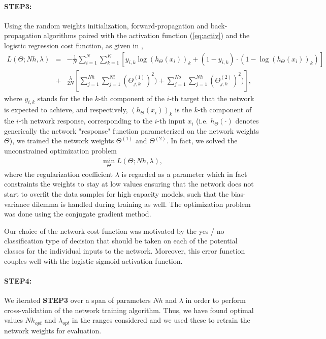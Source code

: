 \documentclass[a4paper,10pt]{article}
\begin{document}
\paragraph{STEP3:}Using the random weights initialization, forward-propagation and back-propagation algorithms paired with the activation function (\ref{eq:activ}) and the logistic regression cost function, as given in \cite{an},
\begin{eqnarray}\label{eq:cost}
L(\Theta;Nh,\lambda) &=& -\frac{1}{N}\sum_{i=1}^{N}\sum_{k=1}^{K}\left[y_{i,k}\log(h_{\Theta}(x_i))_k + (1-y_{i,k})\cdot(1-\log(h_{\Theta}(x_i))_k)\right] \\\nonumber &+& \frac{\lambda}{2N}\left[\sum_{j=1}^{Nh}\sum_{j=1}^{Ni}(\Theta^{(1)}_{j,k})^2) + \sum_{j=1}^{No}\sum_{j=1}^{Nh}(\Theta^{(2)}_{j,k})^2)\right],
\end{eqnarray}
where $y_{i,k}$ stands for the the $k$-th component of the $i$-th target that the network is expected to achieve, and respectively, $(h_{\Theta}(x_i))_k$ is the $k$-th component of the $i$-th network response, corresponding to the $i$-th input $x_i$ (i.e. $h_{\Theta}(\cdot)$ denotes generically the network "response" function parameterized on the network weights $\Theta$), we trained the network weights $\Theta^{(1)}$ and $\Theta^{(2)}$. In fact, we solved the unconstrained optimization problem 
\begin{eqnarray}\label{eq:opt_pb}
\min_{\Theta} L(\Theta;Nh,\lambda),
\end{eqnarray}
where the regularization coefficient $\lambda$ is regarded as a parameter which in fact constraints the weights to stay at low values ensuring that the network does not start to overfit the data samples for high capacity models, such that the bias-variance dilemma is handled during training as well. The optimization problem was done using the conjugate gradient method.

Our choice of the network cost function was motivated by the yes / no classification type of decision that should be taken on each of the potential classes for the individual inputs to the network. Moreover, this error function couples well with the logistic sigmoid activation function.

\paragraph{STEP4:}We iterated \textbf{STEP3} over a span of parameters $Nh$ and $\lambda$ in order to perform cross-validation of the network training algorithm. Thus, we have found optimal values $Nh_{opt}$ and $\lambda_{opt}$ in the ranges considered and we used these to retrain the network weights for evaluation.
\end{document}
